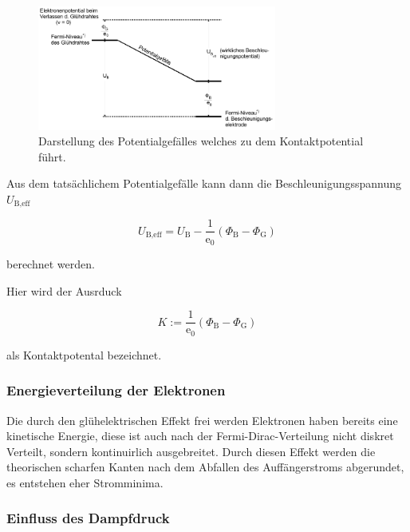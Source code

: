             \begin{figure}[ht]
                \centering
                \includegraphics[width=0.7\textwidth]{latex/images/Kontaktpotential.PNG}
                \caption{Darstellung des Potentialgefälles welches zu dem Kontaktpotential führt.}
                \label{img:pot}
            \end{figure}

            \noindent Aus dem tatsächlichem Potentialgefälle kann dann die Beschleunigungsspannung $U_{\text{B,eff}}$ 
            
            \begin{equation*}
                U_{\text{B,eff}} = U_{\text{B}} - \frac{1}{\text{e}_0} ( \Phi_{\text{B}} - \Phi_{\text{G}})
            \end{equation*}

            \noindent berechnet werden.

            \noindent Hier wird der Ausrduck 

            \begin{equation*}
                K := \frac{1}{\text{e}_0} ( \Phi_{\text{B}} - \Phi_{\text{G}})
            \end{equation*}

            \noindent als Kontaktpotental bezeichnet.

        \subsubsection{Energieverteilung der Elektronen}

            \noindent Die durch den glühelektrischen Effekt frei werden Elektronen haben bereits eine kinetische Energie, diese ist auch nach 
            der Fermi-Dirac-Verteilung nicht diskret Verteilt, sondern kontinuirlich ausgebreitet. Durch diesen Effekt werden die theorischen 
            scharfen Kanten nach dem Abfallen des Auffängerstroms abgerundet, es entstehen eher Stromminima.

        \subsubsection{Einfluss des Dampfdruck}

